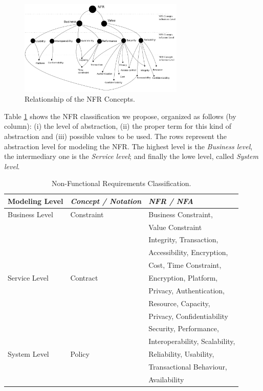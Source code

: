 \documentclass{sig-alternate}
\begin{document}
 
\begin{figure}[ht!]  
\centering  
\includegraphics[width=0.70\textwidth]{figs/nfrRelationship.pdf}
\caption{Relationship of the NFR Concepts.}
\label{fig:nfr-relationship}   
\end{figure}  

Table \ref{tab:result04} shows the NFR classification we propose, organized
 as follows (by column): (i) the level of abstraction, (ii) the proper term for
 this kind of abstraction and (iii) possible values to be used. The rows
 represent the abstraction level for modeling the NFR. The highest level is the
 \textit{Business level}, the intermediary one is the \textit{Service level};
 and finally the lowe level, called \textit{System level}.  
 
 
 

\begin{table}[ht!]
\centering
\tiny
\begin{tabular}{l|l|l}
  \hline 
  \hline
   \textbf{Modeling Level} & \textbf{\textit{Concept / Notation}} & \textbf{\textit{NFR / NFA}}  
   \\
  \hline
  \hline   
  Business Level & Constraint  & Business Constraint,    
 \\  
  &   & Value Constraint\\
   \hline    
   &  & Integrity, Transaction,  \\
   &  & Accessibility, Encryption, \\
   &  & Cost, Time Constraint, \\
  Service Level & Contract & Encryption, Platform, \\
   &  & Privacy, Authentication, \\
   &  & Resource, Capacity, \\
   &  & Privacy, Confidentiability 
   \\   \hline
   &  & Security, Performance,\\ 
   & & Interoperability, Scalability,\\
  System Level & Policy & Reliability, Usability,\\
   & & Transactional Behaviour,\\
   & & Availability \\ 
   \hline
  \hline  
\end{tabular}
\caption{Non-Functional Requirements Classification.}
\label{tab:result04}
\end{table} 
\end{document}
